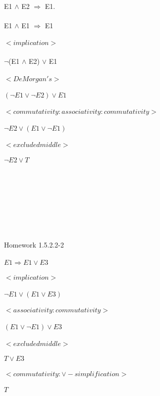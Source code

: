\documentclass[11pt]{article}
\begin{document}
\\
E1 $\land$ E2 $\Rightarrow$ E1.
\\
\\
E1 $\land$ E1 $\Rightarrow$ E1
\\
\\ 
$<implication>$
\\
\\
$\neg$(E1 $\land$ E2) $\vee$ E1
\\
\\
$<DeMorgan's>$ 
\\
\\
$(\neg E1 \vee \neg E2) \vee E1$
\\
\\
$<commutativity: associativity: commutativity>$
\\
\\
$\neg E2 \vee (E1 \vee \neg E1)$
\\
\\
$<excluded middle>$
\\
\\
$\neg E2 \vee T$
\\
\\
\\
\\
\\
\\
\\
\\
\\
Homework 1.5.2.2-2
\\
\\
$E1 \Rightarrow E1 \vee E3$
\\
\\
$<implication>$
\\
\\
$\neg E1 \vee (E1 \vee E3)$
\\
\\
$<associativity: commutativity>$
\\
\\
$(E1 \vee \neg E1) \vee E3$
\\
\\
$<excluded middle>$
\\
\\
$T \vee E3$
\\
\\
$<commutativity: \vee-simplification>$
\\
\\
$T$
\\
\\
\\
\end{document}

